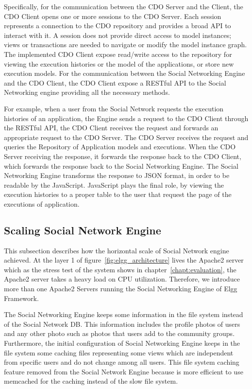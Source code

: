 Specifically, for the communication between the CDO Server and the Client, the CDO Client opens one or more sessions to the CDO Server. Each session represents a connection to the CDO repository and provides a broad API to interact with it. A session does not provide direct access to model instances; views or transactions are needed to navigate or modify the model instance graph. The implemented CDO Client expose read/write access to the repository for viewing the execution histories or the model of the applications, or store new execution models. For the communication between the Social Networking Engine and the CDO Client, the CDO Client expose a RESTful API to the Social Networking engine providing all the necessary methods. 

For example, when a user from the Social Network requests the execution histories of an application, the Engine sends a request to the CDO Client through the RESTful API, the CDO Client receives the request and forwards an appropriate request to the CDO Server. The CDO Server receives the request and queries the Repository of Application models and executions. When the CDO Server receiving the response, it forwards the response back to the CDO Client, which forwards the response back to the Social Networking Engine. The Social Networking Engine transforms the response to JSON format, in order to be readable by the JavaScript. JavaScript plays the final role, by viewing the execution histories to a proper table to the user that request the page of the executions of application.

\subsection{Scaling Social Network Engine}
\label{sec:engine_scale}

This subsection describes how the horizontal scale of Social Network engine achieved. At the layer 1 of figure~\ref{fig:elgg_architecture} lives the Apache2 server which as the stress test of the system shows in chapter~\ref{chapt:evaluation}, the Apache2 server takes a heavy load on CPU utilization. Therefore, we introduce more than one Apache2 Servers running the Social Networking Engine of Elgg Framework. 

The Social Networking Engine keeps some information in the file system instead of the Social Network DB. This information includes the profile photos of users and any other photo such as photos that users add to the community groups. Furthermore, the initial configuration of Social Networking Engine keeps in the file system some caching files representing some views which are independent from specific users and do not change among all users. This file system caching feature removed from the Social Network Engine because is more efficient to use memcached for the caching instead of the slow file system.

